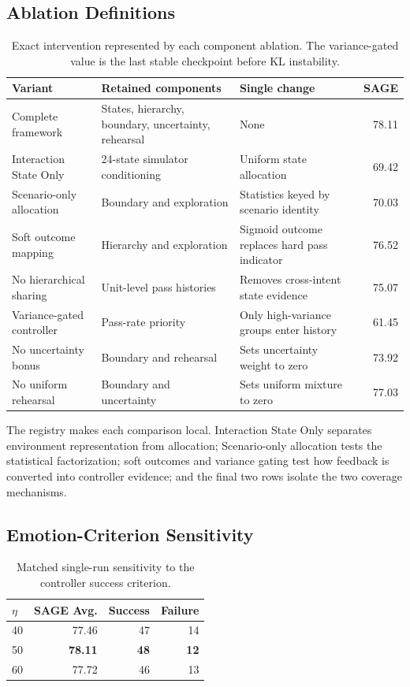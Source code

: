 \subsection{Ablation Definitions}
\begin{table}[t]
\centering
\small
\begin{tabular}{lp{}p{}r}
\toprule
Variant & Retained components & Single change & SAGE \\
\midrule
Complete framework & States, hierarchy, boundary, uncertainty, rehearsal & None & 78.11 \\
Interaction State Only & 24-state simulator conditioning & Uniform state allocation & 69.42 \\
Scenario-only allocation & Boundary and exploration & Statistics keyed by scenario identity & 70.03 \\
Soft outcome mapping & Hierarchy and exploration & Sigmoid outcome replaces hard pass indicator & 76.52 \\
No hierarchical sharing & Unit-level pass histories & Removes cross-intent state evidence & 75.07 \\
Variance-gated controller & Pass-rate priority & Only high-variance groups enter history & 61.45 \\
No uncertainty bonus & Boundary and rehearsal & Sets uncertainty weight to zero & 73.92 \\
No uniform rehearsal & Boundary and uncertainty & Sets uniform mixture to zero & 77.03 \\
\bottomrule
\end{tabular}
\caption{Exact intervention represented by each component ablation. The
variance-gated value is the last stable checkpoint before KL instability.}
\label{tab:supp-ablation-registry}
\end{table}

The registry makes each comparison local. Interaction State Only separates
environment representation from allocation; Scenario-only allocation tests the
statistical factorization; soft outcomes and variance gating test how feedback
is converted into controller evidence; and the final two rows isolate the two
coverage mechanisms.

\subsection{Emotion-Criterion Sensitivity}
\begin{table}[t]
\centering
\small
\begin{tabular}{lrrr}
\toprule
$\eta$ & SAGE Avg. & Success & Failure \\
\midrule
40 & 77.46 & 47 & 14 \\
50 & \textbf{78.11} & \textbf{48} & \textbf{12} \\
60 & 77.72 & 46 & 13 \\
\bottomrule
\end{tabular}
\caption{Matched single-run sensitivity to the controller success criterion.}
\label{tab:supp-threshold}
\end{table}

